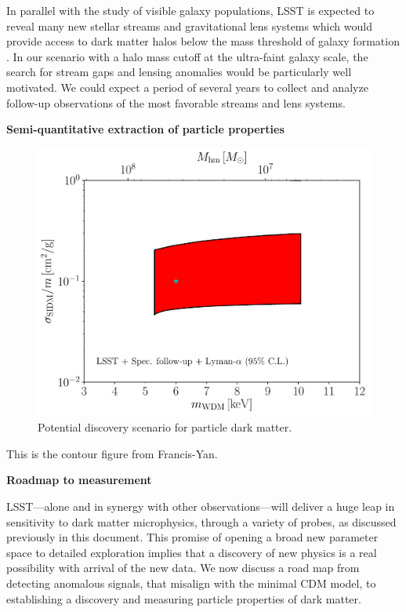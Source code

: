 \documentclass[modern,linenumbers]{aastex62}
\begin{document}
In parallel with the study of visible galaxy populations, LSST is expected to reveal many new stellar streams and gravitational lens systems which would provide access to dark matter halos below the mass threshold of galaxy formation .
In our scenario with a halo mass cutoff at the ultra-faint galaxy scale, the search for stream gaps and lensing anomalies would be particularly well motivated.
We could expect a period of several years to collect and analyze follow-up observations of the most favorable streams and lens systems.

{\bf Semi-quantitative extraction of particle properties}

\begin{figure}
\centering
\includegraphics[width=0.6\columnwidth]{figures/SIDM_WDM_fig_disc.pdf}
\caption{\label{fig:sidm_wdm_disc} Potential discovery scenario for particle dark matter. }
\end{figure}



This is the contour figure from Francis-Yan.

{\bf Roadmap to measurement}

LSST---alone and in synergy with other observations---will deliver a huge leap in sensitivity to dark matter microphysics, through a variety of probes, as discussed previously in this document. 
This promise of opening a broad new parameter space to detailed exploration implies that a discovery of new physics is a real possibility with arrival of the new data. 
We now discuss a road map from detecting anomalous signals, that misalign with the minimal CDM model, to establishing a discovery and measuring particle properties of dark matter.
\end{document}
